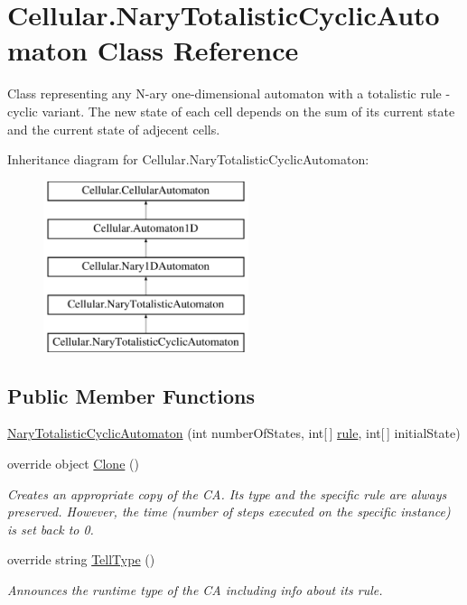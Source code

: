 \hypertarget{class_cellular_1_1_nary_totalistic_cyclic_automaton}{}\section{Cellular.\+Nary\+Totalistic\+Cyclic\+Automaton Class Reference}
\label{class_cellular_1_1_nary_totalistic_cyclic_automaton}


Class representing any N-\/ary one-\/dimensional automaton with a totalistic rule -\/ cyclic variant. The new state of each cell depends on the sum of its current state and the current state of adjecent cells.  


Inheritance diagram for Cellular.\+Nary\+Totalistic\+Cyclic\+Automaton\+:\begin{figure}[H]
\begin{center}
\leavevmode
\includegraphics[height=5.000000cm]{class_cellular_1_1_nary_totalistic_cyclic_automaton}
\end{center}
\end{figure}
\subsection*{Public Member Functions}
\begin{DoxyCompactItemize}
\item 
\hyperlink{class_cellular_1_1_nary_totalistic_cyclic_automaton_a4616b10ffadcaef7a2d21b47976844af}{Nary\+Totalistic\+Cyclic\+Automaton} (int number\+Of\+States, int\mbox{[}$\,$\mbox{]} \hyperlink{class_cellular_1_1_nary_totalistic_automaton_a878c767c6823bd8ed8dc0f7d2ccb1fd2}{rule}, int\mbox{[}$\,$\mbox{]} initial\+State)
\item 
override object \hyperlink{class_cellular_1_1_nary_totalistic_cyclic_automaton_aa8d5a7d77a6dfc5f6e4fae6ba1c6cfd0}{Clone} ()
\begin{DoxyCompactList}\small\item\em Creates an appropriate copy of the C\+A. Its type and the specific rule are always preserved. However, the time (number of steps executed on the specific instance) is set back to 0. \end{DoxyCompactList}\item 
override string \hyperlink{class_cellular_1_1_nary_totalistic_cyclic_automaton_ac5c39cfb72386e3ab6132ab420091ae9}{Tell\+Type} ()
\begin{DoxyCompactList}\small\item\em Announces the runtime type of the C\+A including info about its rule. \end{DoxyCompactList}\end{DoxyCompactItemize}
